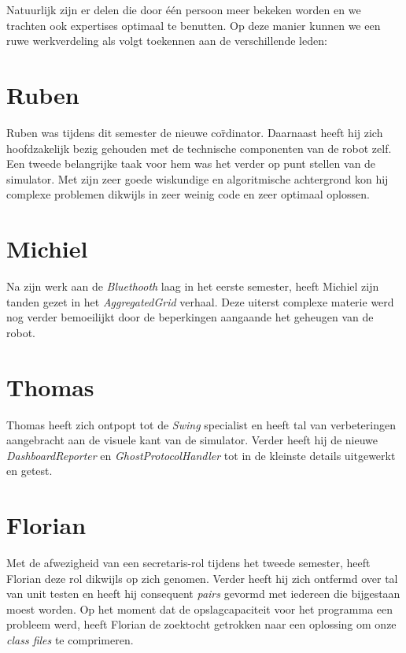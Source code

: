 \documentclass[12pt,a4paper]{report}
\begin{document}
Natuurlijk zijn er delen die door \'e\'en persoon meer bekeken worden en we trachten ook expertises optimaal te benutten. Op deze manier kunnen we een ruwe werkverdeling als volgt toekennen aan de verschillende leden:

\section{Ruben}

Ruben was tijdens dit semester de nieuwe co\"rdinator. Daarnaast heeft hij zich hoofdzakelijk bezig gehouden met de technische componenten van de robot zelf. Een tweede belangrijke taak voor hem was het verder op punt stellen van de simulator. Met zijn zeer goede wiskundige en algoritmische achtergrond kon hij complexe problemen dikwijls in zeer weinig code en zeer optimaal oplossen.

\section{Michiel}

Na zijn werk aan de \emph{Bluethooth} laag in het eerste semester, heeft Michiel zijn tanden gezet in het \emph{AggregatedGrid} verhaal. Deze uiterst complexe materie werd nog verder bemoeilijkt door de beperkingen aangaande het geheugen van de robot.

\section{Thomas}

Thomas heeft zich ontpopt tot de \emph{Swing} specialist en heeft tal van verbeteringen aangebracht aan de visuele kant van de simulator. Verder heeft hij de nieuwe \emph{DashboardReporter} en \emph{GhostProtocolHandler} tot in de kleinste details uitgewerkt en getest.

\section{Florian}

Met de afwezigheid van een secretaris-rol tijdens het tweede semester, heeft Florian deze rol dikwijls op zich genomen. Verder heeft hij zich ontfermd over tal van unit testen en heeft hij consequent \emph{pairs} gevormd met iedereen die bijgestaan moest worden. Op het moment dat de opslagcapaciteit voor het programma een probleem werd, heeft Florian de zoektocht getrokken naar een oplossing om onze \emph{class files} te comprimeren.
\end{document}
